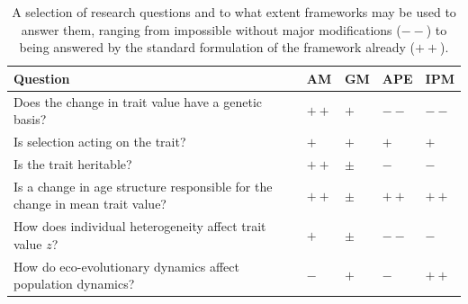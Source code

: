 \newpage
\begin{table}[H] 
\caption{A selection of research questions and to what extent frameworks may be used to answer them, ranging from impossible without major modifications ($--$) to being answered by the standard formulation of the framework already ($++$).}
\label{table:questions}
\begin{center}
\begin{tabular}{p{9cm}|p{1cm} p{1cm} p{1cm} p{1cm}}
\hline
Question & AM & GM & APE & IPM\\
\hline
Does the change in trait value have a genetic basis? & $++$ & $+$ & $--$ & $--$ \\

Is selection acting on the trait? & $+$ & $+$ & $+$ & $+$ \\

Is the trait heritable? & $++$ & $\pm$ & $-$ & $-$ \\

Is a change in age structure responsible for the change in mean trait value? & $++$ & $\pm$ & $++$ & $++$ \\

How does individual heterogeneity affect trait value $z$? & $+$ & $\pm$ & $--$ & $-$ \\

How do eco-evolutionary dynamics affect population dynamics? & $-$ & $+$ & $-$ & $++$ \\

\end{tabular}
\end{center}
\end{table}

